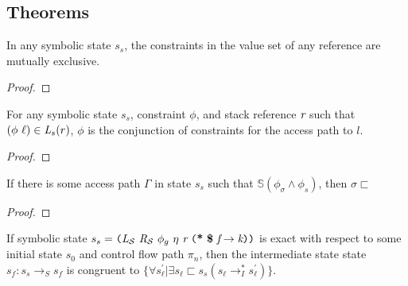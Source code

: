 \subsection{Theorems}

\begin{theorem}
\label{thm:mutex}
In any symbolic state $s_s$, the constraints in the value set of any reference are mutually exclusive.
\end{theorem}
\begin{proof}
\end{proof}

\begin{lemma}
For any symbolic state $s_s$, constraint $\phi$, and stack reference $\emph{r}$ such that $(\phi\ \ell) \in \emph{L}_s (r)$, $\phi$ is the conjunction of constraints for the access path to $l$.
\end{lemma}
\begin{proof}
\end{proof}

\begin{lemma}
If there is some access path $\Gamma$ in state $s_s$ such that $\mathbb{S}(\phi_\sigma \wedge \phi_s)$, then $\sigma \sqsubset$  
\end{lemma}
\begin{proof}
\end{proof}

\begin{lemma}
\label{lem:init}
If symbolic state $s_s = \lp \cfgnt{L}_{\mathcal{S}}\ \cfgnt{R}_{\mathcal{S}}\ \phi_g\ \eta\ \cfgnt{r}\ \lp \cfgt{*}\ \cfgt{\$}\ \cfgnt{f} \rightarrow \cfgnt{k}\rp \rp$ is exact with respect to some initial state $s_0$ and control flow path $\pi_n$, then the intermediate state state $s_f : s_s \rightarrow_S s_f$ is congruent to $\{\forall s_\ell^\prime | \exists s_\ell \sqsubset s_s (s_\ell \rightarrow_I^* s_\ell^\prime)  \}$.
\end{lemma}

